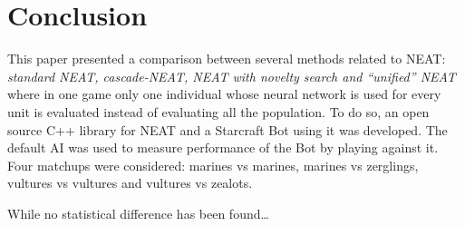 \section{Conclusion}\label{section:conclusion}

This paper presented a comparison between several methods related to NEAT:
\emph{standard NEAT, cascade-NEAT, NEAT with novelty search and ``unified'' NEAT} where
in one game only one individual whose neural network is used for every unit is evaluated
instead of evaluating all the population.
To do so, an open source C++ library for NEAT and a Starcraft Bot using it was developed.
The default AI was used to measure performance of the Bot by playing against it.
Four matchups were considered: marines vs marines, marines vs zerglings, vultures vs vultures
and vultures vs zealots.

While no statistical difference has been found…

